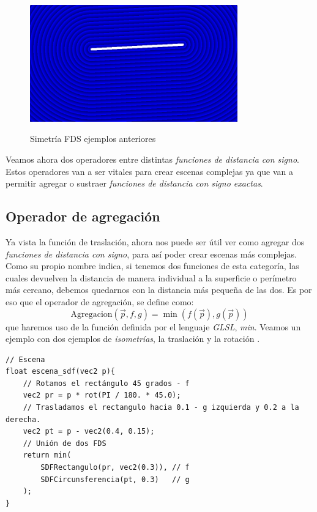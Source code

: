 \begin{figure}[H]
  \centering
  \captionsetup{justification=centering}%
  \includegraphics[width=0.8\textwidth]{secciones/imagenes/sdf/2d/sdf_simetria.png}\label{fig:simetria}
  \caption{Simetría FDS ejemplos anteriores}
\end{figure}

Veamos ahora dos operadores entre distintas \textit{funciones de distancia con signo}. Estos operadores van a ser vitales para crear escenas complejas ya que van a permitir agregar o sustraer \textit{funciones de distancia con signo exactas}.

\subsection{Operador de agregación}
Ya vista la función de traslación, ahora nos puede ser útil ver como agregar dos \textit{funciones de distancia con signo}, para así poder crear escenas más complejas. Como su propio nombre indica, si tenemos dos funciones de esta categoría, las cuales devuelven la distancia de manera individual a la superficie o perímetro más cercano, debemos quedarnos con la distancia más pequeña de las dos. Es por eso que el operador de agregación, se define como:
\[\text{Agregacion}(\Vec{p}, f, g) = \min(f(\Vec{p}), g(\Vec{p})) \]
que haremos uso de la función definida por el lenguaje \textit{GLSL}, \textit{min}. Veamos un ejemplo con dos ejemplos de \textit{isometrías}, la traslación  y la rotación .
\begin{lstlisting}
// Escena
float escena_sdf(vec2 p){
    // Rotamos el rectángulo 45 grados - f
    vec2 pr = p * rot(PI / 180. * 45.0);
    // Trasladamos el rectangulo hacia 0.1 - g izquierda y 0.2 a la derecha.
    vec2 pt = p - vec2(0.4, 0.15);
    // Unión de dos FDS
    return min(
        SDFRectangulo(pr, vec2(0.3)), // f
        SDFCircunsferencia(pt, 0.3)   // g
    );
}
\end{lstlisting}

